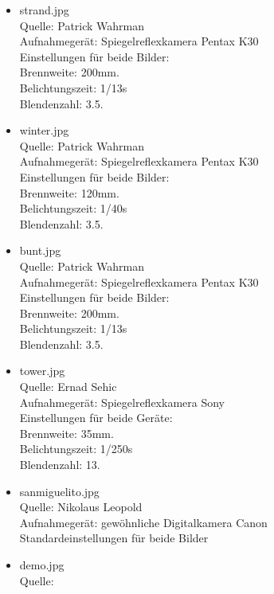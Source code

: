 \documentclass[deutsch]{scrartcl}
\begin{document}
\begin{itemize}
	\item strand.jpg\\
		Quelle: Patrick Wahrman\\
		Aufnahmegerät: Spiegelreflexkamera Pentax K30 \\
		Einstellungen für beide Bilder: \\
		Brennweite: 200mm. \\
		Belichtungszeit: 1/13s \\
		Blendenzahl: 3.5.

	\item winter.jpg\\
		Quelle: Patrick Wahrman\\
		Aufnahmegerät: Spiegelreflexkamera Pentax K30 \\
		Einstellungen für beide Bilder: \\
		Brennweite: 120mm. \\
		Belichtungszeit: 1/40s \\
		Blendenzahl: 3.5.

	\item bunt.jpg\\
		Quelle: Patrick Wahrman\\
		Aufnahmegerät: Spiegelreflexkamera Pentax K30 \\
		Einstellungen für beide Bilder: \\
		Brennweite: 200mm. \\
		Belichtungszeit: 1/13s \\
		Blendenzahl: 3.5.

	\item tower.jpg\\
		Quelle: Ernad Sehic\\
		Aufnahmegerät: Spiegelreflexkamera Sony \\
		Einstellungen für beide Geräte: \\
		Brennweite: 35mm. \\
		Belichtungszeit: 1/250s \\
		Blendenzahl: 13.

	\item sanmiguelito.jpg\\
		Quelle: Nikolaus Leopold \\
		Aufnahmegerät: gewöhnliche Digitalkamera Canon\\
		Standardeinstellungen für beide Bilder

	\item demo.jpg\\
		Quelle: \cite{pandemo}


\end{itemize}
\end{document}
